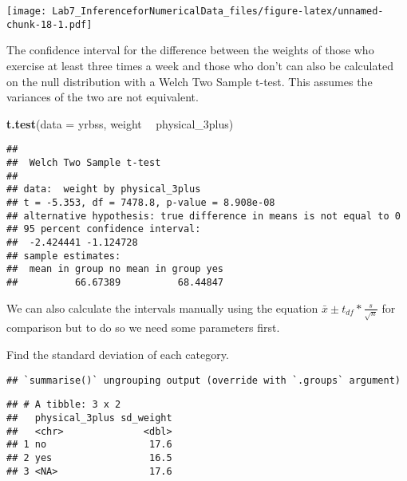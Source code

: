\documentclass[
]{article}
\newenvironment{Shaded}{\begin{snugshade}}{\end{snugshade}}
\newcommand{\DataTypeTok}[1]{\textcolor[rgb]{0.13,0.29,0.53}{#1}}
\newcommand{\KeywordTok}[1]{\textcolor[rgb]{0.13,0.29,0.53}{\textbf{#1}}}
\newcommand{\NormalTok}[1]{#1}
\newcommand{\OperatorTok}[1]{\textcolor[rgb]{0.81,0.36,0.00}{\textbf{#1}}}
\newcommand{\OtherTok}[1]{\textcolor[rgb]{0.56,0.35,0.01}{#1}}
\newcommand{\StringTok}[1]{\textcolor[rgb]{0.31,0.60,0.02}{#1}}
\begin{document}
\texttt{[image: Lab7\_InferenceforNumericalData\_files/figure-latex/unnamed-chunk-18-1.pdf]}

The confidence interval for the difference between the weights of those
who exercise at least three times a week and those who don't can also be
calculated on the null distribution with a Welch Two Sample t-test. This
assumes the variances of the two are not equivalent.

\begin{Shaded}
\begin{Highlighting}[]
\KeywordTok{t.test}\NormalTok{(}\DataTypeTok{data =}\NormalTok{ yrbss, weight }\OperatorTok{~}\StringTok{ }\NormalTok{physical_3plus)}
\end{Highlighting}
\end{Shaded}

\begin{verbatim}
## 
##  Welch Two Sample t-test
## 
## data:  weight by physical_3plus
## t = -5.353, df = 7478.8, p-value = 8.908e-08
## alternative hypothesis: true difference in means is not equal to 0
## 95 percent confidence interval:
##  -2.424441 -1.124728
## sample estimates:
##  mean in group no mean in group yes 
##          66.67389          68.44847
\end{verbatim}

We can also calculate the intervals manually using the equation
\(\bar{x}\pm t_{df}*\frac{s}{\sqrt{n}}\) for comparison but to do so we
need some parameters first.

Find the standard deviation of each category.

\begin{Shaded}
\end{Shaded}

\begin{verbatim}
## `summarise()` ungrouping output (override with `.groups` argument)
\end{verbatim}

\begin{verbatim}
## # A tibble: 3 x 2
##   physical_3plus sd_weight
##   <chr>              <dbl>
## 1 no                  17.6
## 2 yes                 16.5
## 3 <NA>                17.6
\end{verbatim}
\end{document}
